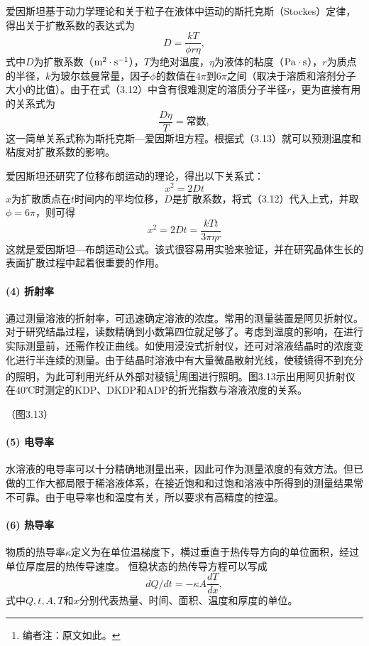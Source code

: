 爱因斯坦基于动力学理论和关于粒子在液体中运动的斯托克斯（Stockes）定律，得出关于扩散系数的表达式为
\begin{equation}
D=\frac{kT}{\phi r\eta},
\end{equation}
式中$D$为扩散系数（$\rm m^2\cdot s^{-1}$），$T$为绝对温度，$\eta$为液体的粘度（$\rm Pa\cdot s$），$r$为质点的半径，$k$为玻尔兹曼常量，因子$\phi$的数值在$4\pi$到$6\pi$之间（取决于溶质和溶剂分子大小的比值）。由于在式（3.12）中含有很难测定的溶质分子半径$r$，更为直接有用的关系式为
\begin{equation}
\frac{D\eta}{T}=\text{常数},
\end{equation}
这一简单关系式称为斯托克斯—爱因斯坦方程。根据式（3.13）就可以预测温度和粘度对扩散系数的影响。

爱因斯坦还研究了位移布朗运动的理论，得出以下关系式：
\begin{equation}
x^2=2Dt
\end{equation}
$x$为扩散质点在$t$时间内的平均位移，$D$是扩散系数，将式（3.12）代入上式，并取$\phi=6\pi$，则可得
\begin{equation}
x^2=2Dt=\frac{kTt}{3\pi\eta r}
\end{equation}
这就是爱因斯坦—布朗运动公式。该式很容易用实验来验证，并在研究晶体生长的表面扩散过程中起着很重要的作用。

\paragraph{(4) 折射率}
通过测量溶液的折射率，可迅速确定溶液的浓度。常用的测量装置是阿贝折射仪。对于研究结晶过程，读数精确到小数第四位就足够了。考虑到温度的影响，在进行实际测量前，还需作校正曲线。如使用浸没式折射仪，还可对溶液结晶时的浓度变化进行半连续的测量。由于结晶时溶液中有大量微晶散射光线，使稜镜得不到充分的照明，为此可利用光纤从外部对稜镜\footnote{编者注：原文如此。}周围进行照明。图3.13示出用阿贝折射仪在40℃时测定的KDP、DKDP和ADP的折光指数与溶液浓度的关系。

（图3.13）

\paragraph{(5) 电导率}
水溶液的电导率可以十分精确地测量出来，因此可作为测量浓度的有效方法。但已做的工作大都局限于稀溶液体系，在接近饱和和过饱和溶液中所得到的测量结果常不可靠。由于电导率也和温度有关，所以要求有高精度的控温。

\paragraph{(6) 热导率}
物质的热导率$\kappa$定义为在单位温梯度下，横过垂直于热传导方向的单位面积，经过单位厚度层的热传导速度。 恒稳状态的热传导方程可以写成
\begin{equation}
dQ/dt=-\kappa A\frac{dT}{dx},
\end{equation}
式中$Q,t,A,T$和$x$分别代表热量、时间、面积、温度和厚度的单位。

